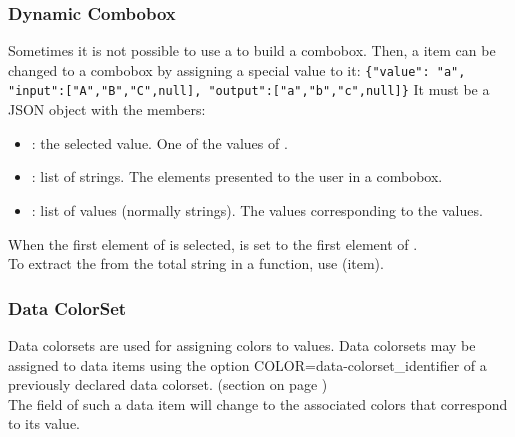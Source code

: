 \newpage
\subsubsection{Dynamic Combobox}
\label{stringdynamiccombobox}
Sometimes it is not possible to use a \SET{} to build a combobox. Then, a \STRING{}
item can be changed to a combobox by assigning a special value to it: \newline
\verb+{"value": "a", "input":["A","B","C",null], "output":["a","b","c",null]}+ \newline
It must be a JSON object with the members:
\begin{itemize}
  \item {}: the selected value. One of the values of .
  \item {}: list of strings. The elements presented to the user in a combobox.
  \item {}: list of values (normally strings). The values corresponding to the  values.
\end{itemize}
When the first element of  is selected,  is set to the first element of . \\
To extract the  from the total string in a function, use \STRINGVALUE{}(item).


\newpage
\subsubsection{Data ColorSet}
\label{sec:dpcolorset}
Data colorsets are used for assigning colors to values. Data colorsets may be assigned
to data items using the option COLOR=data-colorset\_identifier of a previously declared
data colorset. (section  on page \pageref{dia:dataitemoptions}) \\
The field of such a data item will change to the associated colors that correspond to its value.\\

